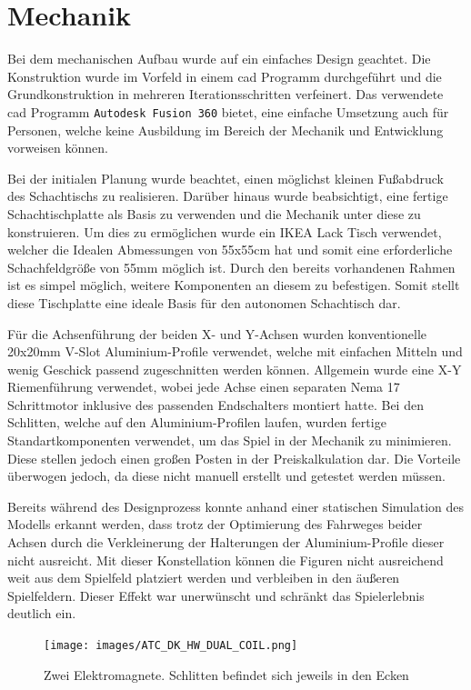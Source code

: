 \hypertarget{mechanik}{%
\section{Mechanik}\label{mechanik}}

Bei dem mechanischen Aufbau wurde auf ein einfaches Design geachtet. Die
Konstruktion wurde im Vorfeld in einem \gls{cad} Programm durchgeführt
und die Grundkonstruktion in mehreren Iterationsschritten verfeinert.
Das verwendete \gls{cad} Programm
\passthrough{\lstinline!Autodesk Fusion 360!} bietet, eine einfache
Umsetzung auch für Personen, welche keine Ausbildung im Bereich der
Mechanik und Entwicklung vorweisen können.

Bei der initialen Planung wurde beachtet, einen möglichst kleinen
Fußabdruck des Schachtischs zu realisieren. Darüber hinaus wurde
beabsichtigt, eine fertige Schachtischplatte als Basis zu verwenden und
die Mechanik unter diese zu konstruieren. Um dies zu ermöglichen wurde
ein IKEA Lack Tisch verwendet, welcher die Idealen Abmessungen von
55x55cm hat und somit eine erforderliche Schachfeldgröße von 55mm
möglich ist. Durch den bereits vorhandenen Rahmen ist es simpel möglich,
weitere Komponenten an diesem zu befestigen. Somit stellt diese
Tischplatte eine ideale Basis für den autonomen Schachtisch dar.

Für die Achsenführung der beiden X- und Y-Achsen wurden konventionelle
20x20mm V-Slot Aluminium-Profile verwendet, welche mit einfachen Mitteln
und wenig Geschick passend zugeschnitten werden können. Allgemein wurde
eine X-Y Riemenführung verwendet, wobei jede Achse einen separaten Nema
17 Schrittmotor inklusive des passenden Endschalters montiert hatte. Bei
den Schlitten, welche auf den Aluminium-Profilen laufen, wurden fertige
Standartkomponenten verwendet, um das Spiel in der Mechanik zu
minimieren. Diese stellen jedoch einen großen Posten in der
Preiskalkulation dar. Die Vorteile überwogen jedoch, da diese nicht
manuell erstellt und getestet werden müssen.

Bereits während des Designprozess konnte anhand einer statischen
Simulation des Modells erkannt werden, dass trotz der Optimierung des
Fahrweges beider Achsen durch die Verkleinerung der Halterungen der
Aluminium-Profile dieser nicht ausreicht. Mit dieser Konstellation
können die Figuren nicht ausreichend weit aus dem Spielfeld platziert
werden und verbleiben in den äußeren Spielfeldern. Dieser Effekt war
unerwünscht und schränkt das Spielerlebnis deutlich ein.

\begin{figure}
\centering
\texttt{[image: images/ATC\_DK\_HW\_DUAL\_COIL.png]}
\caption{Zwei Elektromagnete. Schlitten befindet sich jeweils in den
Ecken \label{ATC_DK_HW_DUAL_COIL}}
\end{figure}

